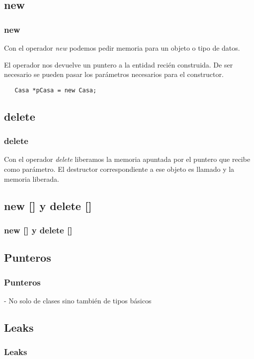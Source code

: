 \documentclass{beamer}
\begin{document}
\subsection{new}
\begin{frame}[fragile]
\frametitle{new}
Con el operador \emph{new} podemos pedir memoria para un objeto o tipo de datos.

El operador nos devuelve un puntero a la entidad recién construida. De ser necesario se pueden pasar los parámetros necesarios para el constructor.

\begin{verbatim}
   Casa *pCasa = new Casa;
\end{verbatim}

\end{frame}

\subsection{delete}
\begin{frame}
\frametitle{delete}

Con el operador \emph{delete} liberamos la memoria apuntada por el puntero que recibe como parámetro.
El destructor correspondiente a ese objeto es llamado y la memoria liberada.

\end{frame}

\subsection{new [] y delete []}
\begin{frame}
\frametitle{new [] y delete []}

\end{frame}

\subsection{Punteros}
\begin{frame}
\frametitle{Punteros}
  
 - No solo de clases sino también de tipos básicos

\end{frame}

\subsection{Leaks}
\begin{frame}
\frametitle{Leaks}
  

\end{frame}
\end{document}

